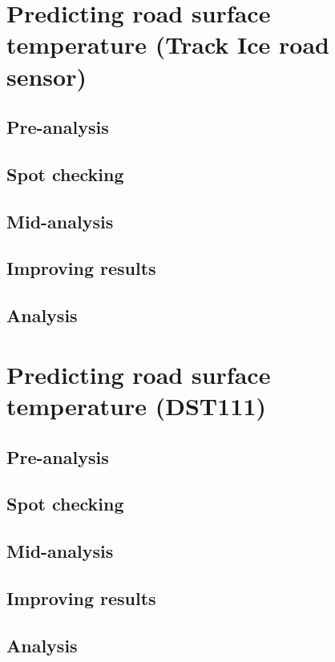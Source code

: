 \section{Predicting road surface temperature (Track Ice road sensor)}
	\subsection{Pre-analysis}
	\subsection{Spot checking}
	\subsection{Mid-analysis}
	\subsection{Improving results}
	\subsection{Analysis}
\section{Predicting road surface temperature (DST111)}
	\subsection{Pre-analysis}
	\subsection{Spot checking}
	\subsection{Mid-analysis}
	\subsection{Improving results}
	\subsection{Analysis}



